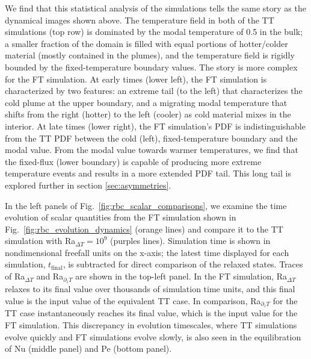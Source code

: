 \documentclass[aps, pre, onecolumn, nofootinbib, notitlepage, groupedaddress, amsfonts, amssymb, amsmath, longbibliography, superscriptaddress]{revtex4-1}
\begin{document}
We find that this statistical analysis of the simulations tells the same story as the dynamical images shown above.
The temperature field in both of the TT simulations (top row) is dominated by the modal temperature of 0.5 in the bulk; a smaller fraction of the domain is filled with equal portions of hotter/colder material (mostly contained in the plumes), and the temperature field is rigidly bounded by the fixed-temperature boundary values.
The story is more complex for the FT simulation.
At early times (lower left), the FT simulation is characterized by two features: an extreme tail (to the left) that characterizes the cold plume at the upper boundary, and a migrating modal temperature that shifts from the right (hotter) to the left (cooler) as cold material mixes in the interior.
At late times (lower right), the FT simulation's PDF is indistinguishable from the TT PDF between the cold (left), fixed-temperature boundary and the modal value.
From the modal value towards warmer temperatures, we find that the fixed-flux (lower boundary) is capable of producing more extreme temperature events and results in a more extended PDF tail.
This long tail is explored further in section \ref{sec:asymmetries}.

In the left panels of Fig.~\ref{fig:rbc_scalar_comparisons}, we examine the time evolution of scalar quantities from the FT simulation shown in Fig.~\ref{fig:rbc_evolution_dynamics} (orange lines) and compare it to the TT simulation with Ra$_{\Delta T} = 10^9$ (purples lines).
Simulation time is shown in nondimensional freefall units on the x-axis; the latest time displayed for each simulation, $t_{\text{final}}$, is subtracted for direct comparison of the relaxed states.
Traces of Ra$_{\Delta T}$ and Ra$_{\partial_z T}$ are shown in the top-left panel.
In the FT simulation, Ra$_{\Delta T}$ relaxes to its final value over thousands of simulation time units, and this final value is the input value of the equivalent TT case.
In comparison, Ra$_{\partial_z T}$ for the TT case instantaneously reaches its final value, which is the input value for the FT simulation.
This discrepancy in evolution timescales, where TT simulations evolve quickly and FT simulations evolve slowly, is also seen in the equilibration of Nu (middle panel) and Pe (bottom panel).
\end{document}
